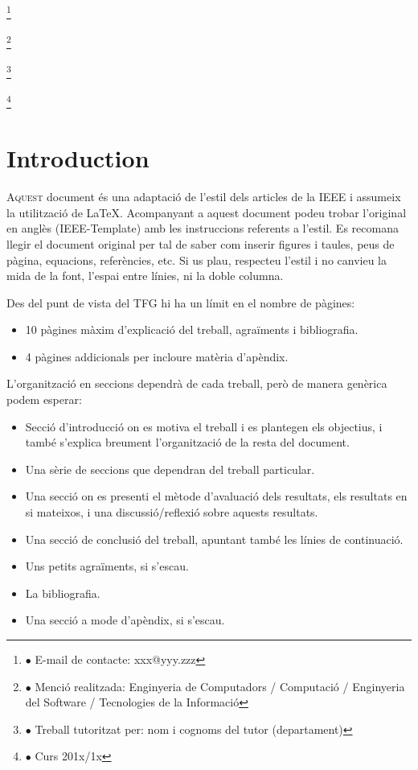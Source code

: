 \documentclass[10pt,a4paper,twocolumn,twoside]{article}
\newcommand\blfootnote[1]{%
  \begingroup
  \renewcommand\thefootnote{}\footnote{#1}%
  \addtocounter{footnote}{-1}%
  \endgroup
}
\begin{document}
\blfootnote{$\bullet$ E-mail de contacte: xxx@yyy.zzz}
\blfootnote{$\bullet$ Menció realitzada: Enginyeria de Computadors / Computació / Enginyeria del Software / Tecnologies de la Informació}
\blfootnote{$\bullet$ Treball tutoritzat per: nom i cognoms del tutor (departament)}
\blfootnote{$\bullet$ Curs 201x/1x}

\section{Introduction}

\lettrine[lines=3]{A}{quest} document és una adaptació  de l'estil dels articles de la IEEE i assumeix la utilització de LaTeX. Acompanyant a aquest document podeu trobar l'original en anglès (IEEE-Template) amb les instruccions referents a l'estil. Es recomana llegir el document original per tal de saber com inserir figures i taules, peus de pàgina, equacions, referències, etc. Si us plau, respecteu l'estil i no canvieu la mida de la font, l'espai entre línies, ni la doble columna.

Des del punt de vista del TFG hi ha un límit en el nombre de pàgines: 

\begin{itemize}
\item 10 pàgines màxim d’explicació del treball, agraïments i bibliografia.
\item 4 pàgines addicionals per incloure matèria d’apèndix.
\end{itemize}

L'organització en seccions dependrà de cada treball, però de manera genèrica podem esperar:

\begin{itemize}
\item Secció d’introducció on es motiva el treball i es plantegen els objectius, i també s’explica breument l’organització de la resta del document.
\item Una sèrie de seccions que dependran del treball particular.
\item Una secció on es presenti el mètode d’avaluació dels resultats, els resultats en si mateixos, i una discussió/reflexió sobre aquests resultats.
\item Una secció de conclusió del treball, apuntant també les línies de continuació.
\item Uns petits agraïments, si s’escau.
\item La bibliografia.
\item Una secció a mode d’apèndix, si s’escau.
\end{itemize}
\end{document}
